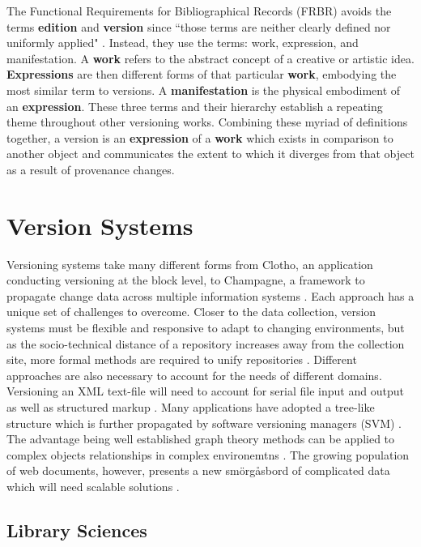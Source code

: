 The Functional Requirements for Bibliographical Records (FRBR) avoids the terms \textbf{edition} and \textbf{version} since ``those terms are neither clearly defined nor uniformly applied" \cite{frbr}.
Instead, they use the terms: work, expression, and manifestation.
A \textbf{work} refers to the abstract concept of a creative or artistic idea.
\textbf{Expressions} are then different forms of that particular \textbf{work}, embodying the most similar term to versions.
A \textbf{manifestation} is the physical embodiment of an \textbf{expression}.
These three terms and their hierarchy establish a repeating theme throughout other versioning works.
Combining these myriad of definitions together, a version is an \textbf{expression} of a \textbf{work} which exists in comparison to another object and communicates the extent to which it diverges from that object as a result of provenance changes.

\section{Version Systems} \label{sec:system}

Versioning systems take many different forms from Clotho, an application conducting versioning at the block level, to Champagne, a framework to propagate change data across multiple information systems \cite{Flouris04clotho:transparent} \cite{Systems02champagne:data}.
Each approach has a unique set of challenges to overcome.
Closer to the data collection, version systems must be flexible and responsive to adapt to changing environments, but as the socio-technical distance of a repository increases away from the collection site, more formal methods are required to unify repositories \cite{Baker2009}.
Different approaches are also necessary to account for the needs of different domains.
Versioning an XML text-file will need to account for serial file input and output as well as structured markup \cite{Chien:2000:VMX:646544.696357}.
Many applications have adopted a tree-like structure which is further propagated by software versioning managers (SVM) \cite{Stuckenholz:2005:CEV:1039174.1039197}.
The advantage being well established graph theory methods can be applied to complex objects relationships in complex environemtns \cite{Dijkstra1994}.
The growing population of web documents, however, presents a new smörgåsbord of complicated data which will need scalable solutions \cite{Berberich:2007:TMT:1277741.1277831}.

\subsection{Library Sciences}

